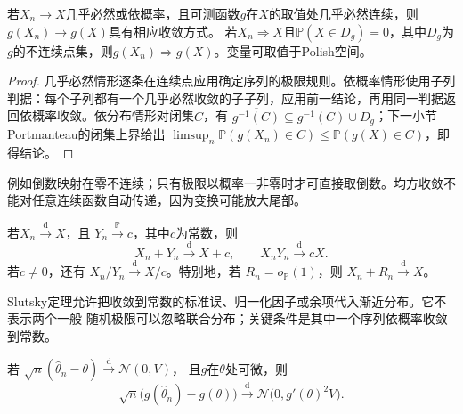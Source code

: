 \begin{theorem}[连续映射]
\label{thm:rv-continuous-mapping}
若\(X_n\to X\)几乎必然或依概率，且可测函数\(g\)在\(X\)的取值处几乎必然连续，则\(g(X_n)\to g(X)\)具有相应收敛方式。
若\(X_n\Rightarrow X\)且\(\mathbb P(X\in D_g)=0\)，其中\(D_g\)为\(g\)的不连续点集，则\(g(X_n)\Rightarrow g(X)\)。变量可取值于Polish空间。
\end{theorem}
\begin{proof}
几乎必然情形逐条在连续点应用确定序列的极限规则。依概率情形使用子列判据：每个子列都有一个几乎必然收敛的子子列，应用前一结论，再用同一判据返回依概率收敛。依分布情形对闭集\(C\)，有
\(\overline{g^{-1}(C)}\subseteq g^{-1}(C)\cup D_g\)；下一小节Portmanteau的闭集上界给出
\(\limsup_n\mathbb P(g(X_n)\in C)\leq\mathbb P(g(X)\in C)\)，即得结论。
\end{proof}
例如倒数映射在零不连续；只有极限以概率一非零时才可直接取倒数。均方收敛不能对任意连续函数自动传递，因为变换可能放大尾部。
\begin{theorem}[Slutsky定理]
  \label{thm:statistics-slutsky}
  若\(X_n\xrightarrow{\mathrm d}X\)，且
  \(Y_n\xrightarrow{\mathbb{P}}c\)，其中\(c\)为常数，则
  \[
    X_n+Y_n\xrightarrow{\mathrm d}X+c,\qquad
    X_nY_n\xrightarrow{\mathrm d}cX.
  \]
  若\(c\neq0\)，还有
  \(X_n/Y_n\xrightarrow{\mathrm d}X/c\)。特别地，若
  \(R_n=o_{\mathbb{P}}(1)\)，则
  \(X_n+R_n\xrightarrow{\mathrm d}X\)。
\end{theorem}

Slutsky定理允许把收敛到常数的标准误、归一化因子或余项代入渐近分布。它不表示两个一般
随机极限可以忽略联合分布；关键条件是其中一个序列依概率收敛到常数。

\begin{theorem}[Delta方法]
\label{thm:statistics-delta-method}
若
\(\sqrt n(\widehat\theta_n-\theta)\xrightarrow{\mathrm d}\mathcal N(0,V)\)，
且\(g\)在\(\theta\)处可微，则
\[
  \sqrt n\bigl(g(\widehat\theta_n)-g(\theta)\bigr)
  \xrightarrow{\mathrm d}
  \mathcal N\bigl(0,g'(\theta)^2V\bigr).
\]
\end{theorem}

